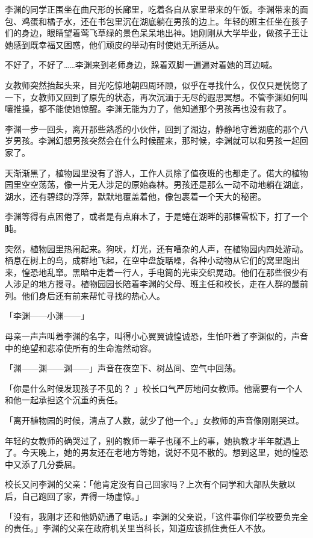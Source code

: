 \documentclass[UTF8]{ctexart}
\begin{document}
李渊的同学正围坐在曲尺形的长廊里，吃着各自从家里带来的午饭。李渊带来的面包、鸡蛋和橘子水，还在书包里沉在湖底躺在男孩的边上。年轻的班主任坐在孩子们的身边，眼睛望着莺飞草绿的景色呆呆地出神。她刚刚从大学毕业，做孩子王让她感到既幸福又困惑，他们顽皮的举动有时使她无所适从。

不好了，不好了\ldots\ldots 李渊来到老师身边，跺着双脚一遍遍对着她的耳边喊。

女教师突然抬起头来，目光吃惊地朝四周环顾，似乎在寻找什么，仅仅只是恍惚了一下，女教师又回到了原先的状态，再次沉湎于无尽的遐思冥想。不管李渊如何叫嚷推搡，都不能使她惊醒。李渊无能为力了，他知道那个男孩再也没有救了。

李渊一步一回头，离开那些熟悉的小伙伴，回到了湖边，静静地守着湖底的那个八岁男孩。李渊幻想男孩突然会在什么时候醒来，那时候，李渊就可以和男孩一起回家了。

天渐渐黑了，植物园里没有了游人，工作人员除了值夜班的也都走了。偌大的植物园里空空荡荡，像一片无人涉足的原始森林。男孩还是那么一动不动地躺在湖底，湖水，还有碧绿的浮萍，默默地覆盖着他，像包裹着一个天大的秘密。

李渊等得有点困倦了，或者是有点麻木了，于是蜷在湖畔的那棵雪松下，打了一个盹。

突然，植物园里热闹起来。狗吠，灯光，还有嘈杂的人声，在植物园内四处游动。栖息在树上的鸟，成群地飞起，在空中盘旋聒噪，各种小动物从它们的窝里跑出来，惶恐地乱窜。黑暗中走着一行人，手电筒的光束交织晃动。他们在那些很少有人涉足的地方搜寻。植物园园长陪着李渊的父母、班主任和校长，走在人群的最前列。他们身后还有前来帮忙寻找的热心人。

「李渊------小渊------」

母亲一声声叫着李渊的名字，叫得小心翼翼诚惶诚恐，生怕吓着了李渊似的，声音中的绝望和悲凉使所有的生命澹然动容。

「渊------渊------渊------」声音在夜空下、树丛间、空气中回荡。

「你是什么时候发现孩子不见的？
」校长口气严厉地问女教师。他需要有一个人和他一起承担这个沉重的责任。

「离开植物园的时候，清点了人数，就少了他一个。」女教师的声音像刚刚哭过。

年轻的女教师的确哭过了，别的教师一辈子也碰不上的事，她执教才半年就遇上了。今天晚上，她的男友还在老地方等她，说好不见不散的。想到这里，她的惶恐中又添了几分委屈。

校长又问李渊的父亲：「他肯定没有自己回家吗？上次有个同学和大部队失散以后，自己跑回了家，弄得一场虚惊。」

「没有，我刚才还和他奶奶通了电话。」李渊的父亲说，「这件事你们学校要负完全的责任。」李渊的父亲在政府机关里当科长，知道应该抓住责任人不放。
\end{document}
